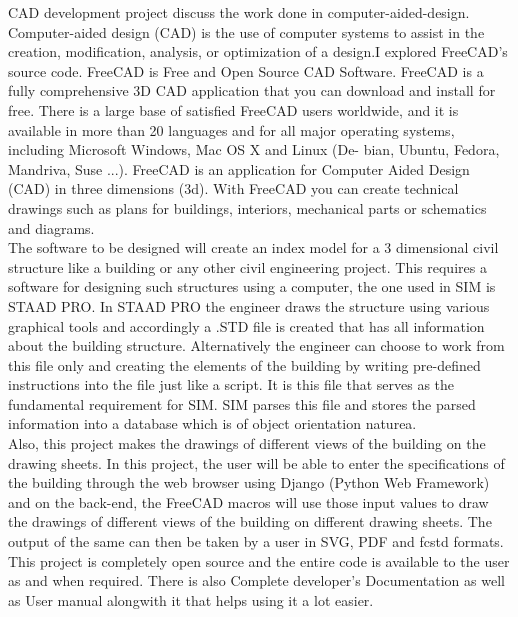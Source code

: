 \begin{Large}
\end{Large}

CAD development project discuss the work done in computer-aided-design. Computer-aided design (CAD) is the use of computer systems to assist in the creation, modification, analysis, or optimization of a design.I explored FreeCAD’s source code. FreeCAD is Free and Open Source CAD Software. FreeCAD
is a fully comprehensive 3D CAD application that you can download and install for free. There is
a large base of satisfied FreeCAD users worldwide, and it is available in more than 20 languages
and for all major operating systems, including Microsoft Windows, Mac OS X and Linux (De-
bian, Ubuntu, Fedora, Mandriva, Suse ...). FreeCAD is an application for Computer Aided Design
(CAD) in three dimensions (3d). With FreeCAD you can create technical drawings such as plans
for buildings, interiors, mechanical parts or schematics and diagrams.\\

The software to be designed will create an index model for a 3 dimensional civil structure like
a building or any other civil engineering project. This requires a software for designing such
structures using a computer, the one used in SIM is STAAD PRO. In STAAD PRO the engineer
draws the structure using various graphical tools and accordingly a .STD file is created that has
all information about the building structure. Alternatively the engineer can choose to work from
this file only and creating the elements of the building by writing pre-defined instructions into the
file just like a script. It is this file that serves as the fundamental requirement for SIM. SIM parses
this file and stores the parsed information into a database which is of object orientation naturea.\\

Also, this project makes the drawings of different views of the building on the drawing sheets.
In this project, the user will be able to enter the specifications of the building through the web
browser using Django (Python Web Framework) and on the back-end, the FreeCAD macros will
use those input values to draw the drawings of different views of the building on different drawing
sheets. The output of the same can then be taken by a user in SVG, PDF and fcstd formats.\\

This project is completely open source and the entire code is available 
to the user as and when required. There is also Complete developer's 
Documentation as well as User manual alongwith it that helps using it a lot easier.
